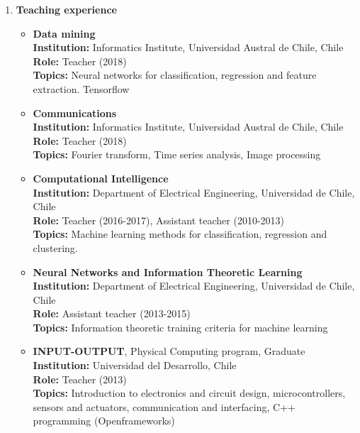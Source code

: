 \documentclass[letterpaper,11pt]{article}
\newcommand{\compactlist}{\setlength{\parskip}{0pt} \setlength{\leftskip}{2em}}
\begin{document}
\begin{enumerate}[I]
	
	    
	\item \textbf{Teaching experience}
	
		\begin{itemize}  \compactlist
		\item \textbf{Data mining}\\
		    \textbf{Institution:} Informatics Institute, Universidad Austral de Chile, Chile \\
            \textbf{Role:} Teacher (2018) \\
            \textbf{Topics:} Neural networks for classification, regression and feature extraction. Tensorflow
        \item \textbf{Communications} \\
		    \textbf{Institution:} Informatics Institute, Universidad Austral de Chile, Chile \\
            \textbf{Role:} Teacher (2018) \\
            \textbf{Topics:} Fourier transform, Time series analysis, Image processing
        \item \textbf{Computational Intelligence} \\
            \textbf{Institution:} Department of Electrical Engineering, Universidad de Chile, Chile \\
            \textbf{Role:} Teacher (2016-2017), Assistant teacher (2010-2013)\\
            \textbf{Topics:} Machine learning methods for classification, regression and clustering. %
        \item \textbf{Neural Networks and Information Theoretic Learning} \\
            \textbf{Institution:} Department of Electrical Engineering, Universidad de Chile, Chile \\
            \textbf{Role:} Assistant teacher (2013-2015) \\
            \textbf{Topics:} Information theoretic training criteria for machine learning %
        \item \textbf{INPUT-OUTPUT}, Physical Computing program, Graduate \\
            \textbf{Institution:} Universidad del Desarrollo, Chile \\
            \textbf{Role:} Teacher (2013) \\
            \textbf{Topics:} Introduction to electronics and circuit design, microcontrollers, sensors and actuators, communication and interfacing, C++ programming (Openframeworks)
 

\end{itemize}
\end{enumerate}
\end{document}
